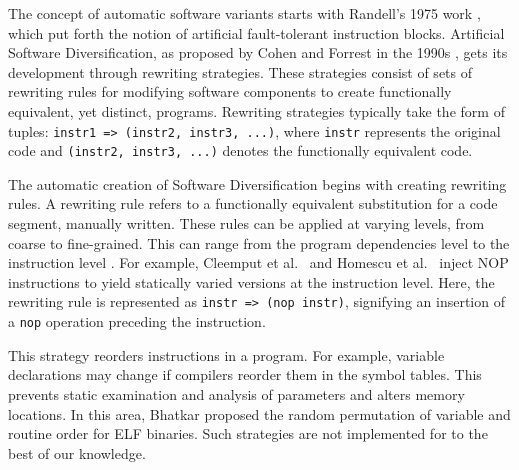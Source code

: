 \label{artificial_diversity}

The concept of automatic software variants starts with Randell's 1975 work \cite{10.1145/390016.808467}, which put forth the notion of artificial fault-tolerant instruction blocks. 
Artificial Software Diversification, as proposed by Cohen and Forrest in the 1990s \cite{cohen1993operating, 595185}, gets its development through rewriting strategies. 
These strategies consist of sets of rewriting rules for modifying software components to create functionally equivalent, yet distinct, programs. 
Rewriting strategies typically take the form of tuples: \texttt{instr1 => (instr2, instr3, ...)}, where \texttt{instr} represents the original code and \texttt{(instr2, instr3, ...)} denotes the functionally equivalent code.


\begin{strategy}
    \label{rewriting_strategy}
    The automatic creation of Software Diversification begins with creating rewriting rules.
    A rewriting rule refers to a functionally equivalent substitution for a code segment, manually written. 
    These rules can be applied at varying levels, from coarse to fine-grained. 
    This can range from the program dependencies level \cite{Harrand1650630} to the instruction level \cite{offensive_div}. 
    For example, Cleemput et al.~\cite{Cleemput2012} and Homescu et al.~\cite{homescu2013profile} inject NOP instructions to yield statically varied versions at the instruction level. 
    Here, the rewriting rule is represented as \texttt{instr => (nop instr)}, signifying an insertion of a \texttt{nop} operation preceding the instruction.


\end{strategy}



\begin{strategy}
    \label{instruction_reordering}
    This strategy reorders instructions in a program.
    For example, variable declarations may change if compilers reorder them in the symbol tables. 
    This prevents static examination and analysis of parameters and alters memory locations. 
    In this area, Bhatkar \etal \cite{bhatkar03, bhatkar2005efficient} proposed the random permutation of variable and routine order for ELF binaries.
    Such strategies are not implemented for \Wasm to the best of our knowledge.
\end{strategy}


